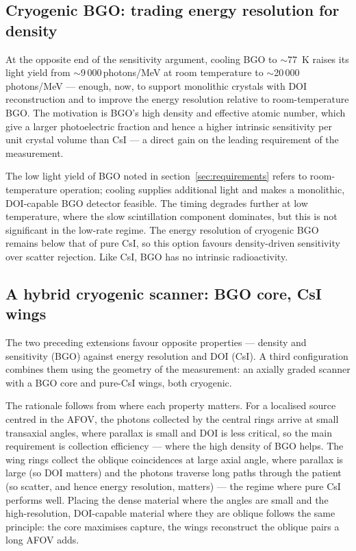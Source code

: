 \documentclass{iopjournal}
\begin{document}
\subsection{Cryogenic BGO: trading energy resolution for density}
\label{sec:cryobgo}

At the opposite end of the sensitivity argument, cooling BGO to $\sim$\SI{77}{\kelvin}
raises its light yield from $\sim$9\,000\,photons/MeV at room temperature to
$\sim$20\,000\,photons/MeV --- enough, now, to support monolithic crystals with
DOI reconstruction and to improve the energy resolution relative to
room-temperature BGO. The motivation is BGO's high density and effective atomic
number, which give a larger photoelectric fraction and hence a higher intrinsic
sensitivity per unit crystal volume than CsI --- a direct gain on the leading
requirement of the measurement.

The low light yield of BGO noted in section~\ref{sec:requirements} refers to
room-temperature operation; cooling supplies additional light and makes a
monolithic, DOI-capable BGO detector feasible. The timing degrades further at low
temperature, where the slow scintillation component dominates, but this is not
significant in the low-rate regime. The energy resolution of cryogenic BGO
remains below that of pure CsI, so this option favours density-driven sensitivity
over scatter rejection. Like CsI, BGO has no intrinsic radioactivity.

\subsection{A hybrid cryogenic scanner: BGO core, CsI wings}
\label{sec:hybrid}

The two preceding extensions favour opposite properties --- density and
sensitivity (BGO) against energy resolution and DOI (CsI). A third configuration
combines them using the geometry of the measurement: an axially graded scanner
with a BGO core and pure-CsI wings, both cryogenic.

The rationale follows from where each property matters. For a localised source
centred in the AFOV, the photons collected by the central rings arrive at small
transaxial angles, where parallax is small and DOI is less critical, so the main
requirement is collection efficiency --- where the high density of BGO helps. The
wing rings collect the oblique coincidences at large axial angle, where parallax
is large (so DOI matters) and the photons traverse long paths through the patient
(so scatter, and hence energy resolution, matters) --- the regime where pure CsI
performs well. Placing the dense material where the angles are small and the
high-resolution, DOI-capable material where they are oblique follows the same
principle: the core maximises capture, the wings reconstruct the oblique pairs a
long AFOV adds.
\end{document}
